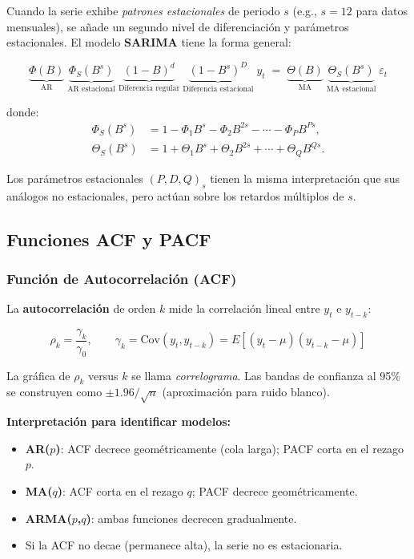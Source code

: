 \documentclass[12pt, a4paper]{article}
\begin{document}
Cuando la serie exhibe \emph{patrones estacionales} de periodo $s$
(e.g., $s=12$ para datos mensuales), se añade un segundo nivel de diferenciación
y parámetros estacionales. El modelo \textbf{SARIMA} tiene la forma general:

\begin{defbox}
\begin{equation}
  \underbrace{\Phi(B)}_{\text{AR}}\;
  \underbrace{\Phi_S(B^s)}_{\text{AR estacional}}\;
  \underbrace{(1-B)^d}_{\text{Diferencia regular}}\;
  \underbrace{(1-B^s)^D}_{\text{Diferencia estacional}}\;
  y_t
  \;=\;
  \underbrace{\Theta(B)}_{\text{MA}}\;
  \underbrace{\Theta_S(B^s)}_{\text{MA estacional}}\;
  \varepsilon_t
  \label{eq:sarima}
\end{equation}
\end{defbox}

donde:
\begin{align*}
  \Phi_S(B^s) &= 1 - \Phi_1 B^s - \Phi_2 B^{2s} - \cdots - \Phi_P B^{Ps}, \\
  \Theta_S(B^s) &= 1 + \Theta_1 B^s + \Theta_2 B^{2s} + \cdots + \Theta_Q B^{Qs}.
\end{align*}

Los parámetros estacionales $(P,D,Q)_s$ tienen la misma interpretación que
sus análogos no estacionales, pero actúan sobre los retardos múltiplos de $s$.

\subsection{Funciones ACF y PACF}

\subsubsection{Función de Autocorrelación (ACF)}

La \textbf{autocorrelación} de orden $k$ mide la correlación lineal entre
$y_t$ e $y_{t-k}$:

\begin{equation}
  \rho_k = \frac{\gamma_k}{\gamma_0},
  \qquad \gamma_k = \text{Cov}(y_t, y_{t-k}) = E[(y_t - \mu)(y_{t-k} - \mu)]
  \label{eq:acf}
\end{equation}

La gráfica de $\rho_k$ versus $k$ se llama \emph{correlograma}. Las bandas
de confianza al 95\% se construyen como $\pm 1.96/\sqrt{n}$ (aproximación
para ruido blanco).

\begin{notebox}
\textbf{Interpretación para identificar modelos:}
\begin{itemize}[leftmargin=*,noitemsep]
  \item \textbf{AR($p$)}: ACF decrece geométricamente (cola larga); PACF corta en el rezago $p$.
  \item \textbf{MA($q$)}: ACF corta en el rezago $q$; PACF decrece geométricamente.
  \item \textbf{ARMA($p$,$q$)}: ambas funciones decrecen gradualmente.
  \item Si la ACF no decae (permanece alta), la serie no es estacionaria.
\end{itemize}
\end{notebox}
\end{document}
